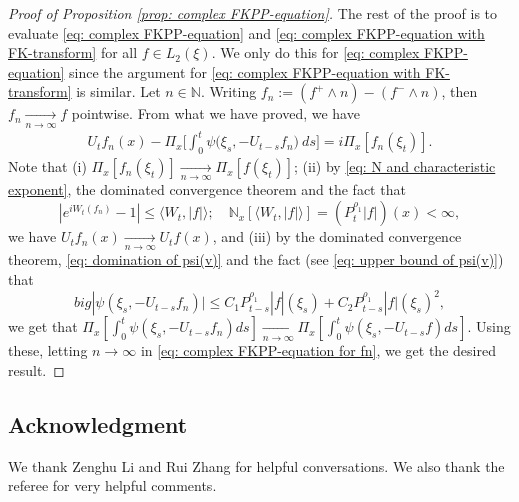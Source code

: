 \documentclass[12pt,a4paper]{amsart}
\theoremstyle{plain}
\theoremstyle{definition}
\numberwithin{equation}{section}
\begin{document}
\begin{proof}[Proof of Proposition \ref{prop: complex FKPP-equation}]
  The rest of the proof is to evaluate \eqref{eq: complex FKPP-equation} and \eqref{eq: complex FKPP-equation with FK-transform} for all $f\in L_2(\xi)$. We only do this for \eqref{eq: complex FKPP-equation} since the argument for \eqref{eq: complex FKPP-equation with FK-transform} is similar.
  Let $n \in \mathbb N$.
  Writing $f_n := (f^+ \wedge n) - (f^- \wedge n)$, then $f_n \xrightarrow[n\to \infty]{} f$ pointwise.
  From what we have proved, we have
  \begin{align}
    \label{eq: complex FKPP-equation for fn}
    U_tf_n(x) - \Pi_{x} \Big[\int_0^t \psi\big(\xi_s, - U_{t-s}f_n\big) ~ds\Big]
    = i \Pi_{x} [f_n(\xi_t)].
  \end{align}
  Note that
  (i) $\Pi_{x}[f_n(\xi_t)] \xrightarrow[n\to \infty]{} \Pi_{x}[f(\xi_t)]$;
  (ii) by \eqref{eq: N and characteristic exponent}, the dominated convergence theorem and the fact that
  \[
    |e^{i W_t(f_n)} - 1| \leq \langle W_t, |f|\rangle;
    \quad \mathbb N_x[\langle W_t, |f|\rangle] = (P_t^{\rho_1} |f|)(x) < \infty,
  \]
  we have $U_tf_n(x) \xrightarrow[n\to \infty]{} U_tf(x)$, and (iii) by the dominated convergence theorem, \eqref{eq: domination of psi(v)} and the fact (see \eqref{eq: upper bound of psi(v)}) that
  \[
    big|\psi(\xi_s,- U_{t-s}f_n)\big|
    \leq C_1 P_{t-s}^{\rho_1}|f|(\xi_s)+C_2 P_{t-s}^{\rho_1}|f|(\xi_s)^2,
  \]
  we get that $\Pi_{x} [\int_0^t \psi(\xi_s,- U_{t-s}f_n)ds] \xrightarrow[n\to \infty]{} \Pi_{x} [\int_0^t \psi(\xi_s,- U_{t-s}f)ds]$.
  Using these, letting $n \to \infty$ in \eqref{eq: complex FKPP-equation for fn}, we get the desired result.
\end{proof}

\subsection*{Acknowledgment}
We thank Zenghu Li and Rui Zhang for helpful conversations.
We also thank the referee for very helpful comments.
\end{document}
